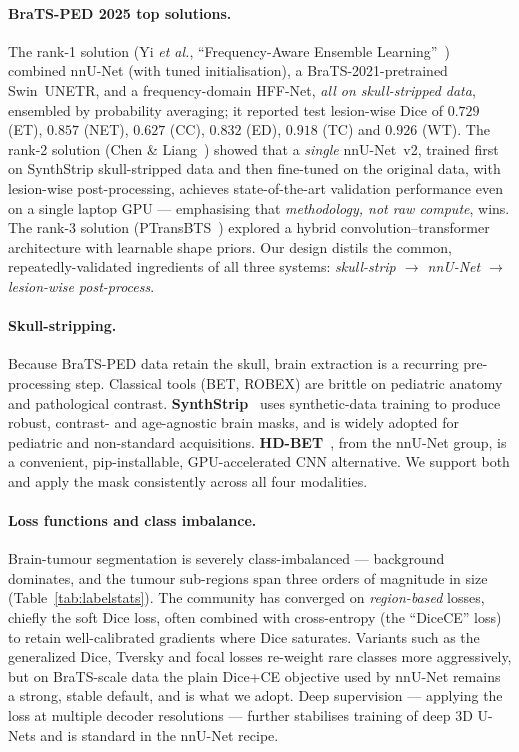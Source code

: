 \documentclass[11pt,a4paper]{article}
\begin{document}
\paragraph{BraTS-PED 2025 top solutions.}
The rank-1 solution (Yi \emph{et al.}, ``Frequency-Aware Ensemble
Learning''~\cite{yi2025}) combined nnU-Net (with tuned initialisation), a
BraTS-2021-pretrained Swin~UNETR, and a frequency-domain HFF-Net, \emph{all on
skull-stripped data}, ensembled by probability averaging; it reported test
lesion-wise Dice of $0.729$ (ET), $0.857$ (NET), $0.627$ (CC), $0.832$ (ED),
$0.918$ (TC) and $0.926$ (WT). The rank-2 solution (Chen \&
Liang~\cite{chen2025}) showed that a \emph{single} nnU-Net~v2, trained first on
SynthStrip skull-stripped data and then fine-tuned on the original data, with
lesion-wise post-processing, achieves state-of-the-art validation performance even on
a single laptop GPU --- emphasising that \emph{methodology, not raw compute}, wins.
The rank-3 solution (PTransBTS~\cite{yu2025}) explored a hybrid
convolution--transformer architecture with learnable shape priors. Our design
distils the common, repeatedly-validated ingredients of all three systems:
\emph{skull-strip $\rightarrow$ nnU-Net $\rightarrow$ lesion-wise post-process}.

\paragraph{Skull-stripping.}
Because BraTS-PED data retain the skull, brain extraction is a recurring
pre-processing step. Classical tools (BET, ROBEX) are brittle on pediatric anatomy
and pathological contrast. \textbf{SynthStrip}~\cite{synthstrip} uses synthetic-data
training to produce robust, contrast- and age-agnostic brain masks, and is widely
adopted for pediatric and non-standard acquisitions. \textbf{HD-BET}~\cite{hdbet},
from the nnU-Net group, is a convenient, pip-installable, GPU-accelerated CNN
alternative. We support both and apply the mask consistently across all four
modalities.

\paragraph{Loss functions and class imbalance.}
Brain-tumour segmentation is severely class-imbalanced --- background dominates, and
the tumour sub-regions span three orders of magnitude in size (Table~\ref{tab:labelstats}).
The community has converged on \emph{region-based} losses, chiefly the soft Dice
loss, often combined with cross-entropy (the ``DiceCE'' loss) to retain
well-calibrated gradients where Dice saturates. Variants such as the generalized Dice,
Tversky and focal losses re-weight rare classes more aggressively, but on BraTS-scale
data the plain Dice+CE objective used by nnU-Net remains a strong, stable default,
and is what we adopt. Deep supervision --- applying the loss at multiple decoder
resolutions --- further stabilises training of deep 3D U-Nets and is standard in the
nnU-Net recipe.
\end{document}
